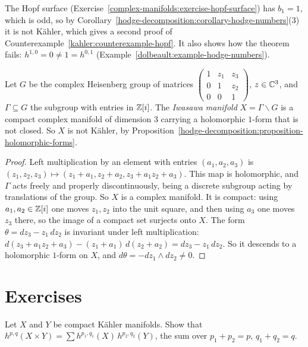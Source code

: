 \begin{counterexample}\label{hodge-decomposition:counterexample-hopf}
The Hopf surface (Exercise~\ref{complex-manifolds:exercise-hopf-surface}) has $b_1 = 1$, which is odd, so by
Corollary~\ref{hodge-decomposition:corollary-hodge-numbers}(3) it is not K\"ahler, which gives a second proof of
Counterexample~\ref{kahler:counterexample-hopf}. It also shows how the theorem fails: $h^{1,0} = 0 \neq 1 = h^{0,1}$
(Example~\ref{dolbeault:example-hodge-numbers}).
\end{counterexample}

\begin{counterexample}\label{hodge-decomposition:counterexample-iwasawa}
Let $G$ be the complex Heisenberg group of matrices
$\left(\begin{smallmatrix}1 & z_1 & z_3 \\ 0 & 1 & z_2 \\ 0 & 0 & 1\end{smallmatrix}\right)$, $z \in \mathbb{C}^3$, and $\Gamma \subseteq G$ the
subgroup with entries in $\mathbb{Z}[i]$. The \emph{Iwasawa manifold} $X = \Gamma\backslash G$ is a compact complex manifold of dimension $3$ carrying
a holomorphic $1$-form that is not closed. So $X$ is not K\"ahler, by Proposition~\ref{hodge-decomposition:proposition-holomorphic-forms}.
\end{counterexample}

\begin{proof}
Left multiplication by an element with entries $(a_1, a_2, a_3)$ is
$(z_1, z_2, z_3) \mapsto (z_1 + a_1, z_2 + a_2, z_3 + a_1z_2 + a_3)$. This map is holomorphic, and $\Gamma$ acts freely and properly
discontinuously, being a discrete subgroup acting by translations of the group. So $X$ is a complex manifold. It is compact: using
$a_1, a_2 \in \mathbb{Z}[i]$ one moves $z_1, z_2$ into the unit square, and then using $a_3$ one moves $z_3$ there, so the image of a compact
set surjects onto $X$. The form $\theta = dz_3 - z_1\,dz_2$ is invariant under left multiplication:
$d(z_3 + a_1z_2 + a_3) - (z_1 + a_1)\,d(z_2 + a_2) = dz_3 - z_1\,dz_2$. So it descends to a holomorphic $1$-form on $X$, and
$d\theta = -dz_1 \wedge dz_2 \neq 0$.
\end{proof}

\section{Exercises}\label{hodge-decomposition:section-exercises}

\begin{exercise}\label{hodge-decomposition:exercise-kunneth-hodge}
Let $X$ and $Y$ be compact K\"ahler manifolds. Show that
$h^{p,q}(X \times Y) = \sum h^{p_1,q_1}(X)\,h^{p_2,q_2}(Y)$, the sum over $p_1 + p_2 = p$, $q_1 + q_2 = q$.
\end{exercise}

